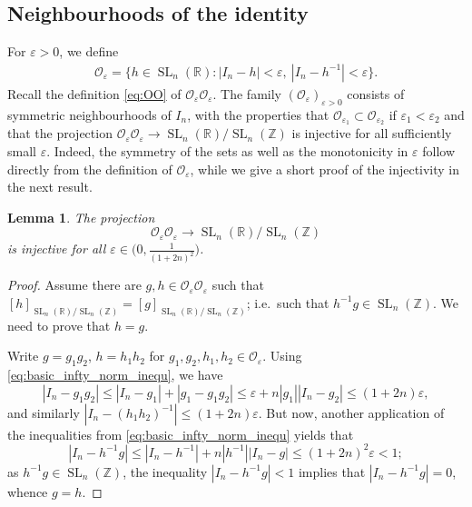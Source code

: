 \documentclass[11pt,reqno]{amsart}
\newtheorem{lem}[thm]{Lemma}
\theoremstyle{definition}
\theoremstyle{remark}
\newcommand{\SL}{\operatorname{SL}}
\numberwithin{equation}{section}
\numberwithin{thm}{section}
\numberwithin{table}{section}
\def \R {{\mathbb R}}
\def \Z {{\mathbb Z}}
\begin{document}
\subsection{Neighbourhoods of the identity}


 For $\varepsilon > 0$, we define 
\begin{align}\label{eq:nbh_id}
    \mathcal{O}_\varepsilon = 
    \{ 
    h \in \SL_n(\R):
    | 
    I_n - h
    | < \varepsilon, \ 
    | 
    I_n - h^{-1}
    | < \varepsilon
    \}.
\end{align}
Recall the definition \eqref{eq:OO} of 
$\mathcal{O}_{\varepsilon}\mathcal{O}_{\varepsilon}$.
The family $(\mathcal{O}_\varepsilon)_{\varepsilon>0}$ consists of symmetric neighbourhoods of $I_n$, with the properties that $\mathcal{O}_{\varepsilon_1} \subset \mathcal{O}_{\varepsilon_2}$ if $\varepsilon_1 < \varepsilon_2$ and that the projection $\mathcal{O}_{\varepsilon}\mathcal{O}_{\varepsilon} \to \SL_n(\R) / \SL_n(\Z)$ is injective for all sufficiently small $\varepsilon$. 
Indeed, the symmetry of the sets as well as the monotonicity in  $\varepsilon$ follow directly from the definition of $\mathcal{O}_\varepsilon$, while we give a short proof of the injectivity in the next result.

\begin{lem}
     The projection 
     $$
     \mathcal{O}_{\varepsilon}\mathcal{O}_{\varepsilon} \to \SL_n(\R) / \SL_n(\Z)
     $$ 
     is injective for all $\varepsilon \in \big(0,\frac{1}{(1+2n)^2}\big)$. 
\end{lem}
\begin{proof}
    Assume  there are $g,h \in \mathcal{O}_\varepsilon \mathcal{O}_{\varepsilon}$ such that $[h]_{\SL_n(\R) / \SL_n(\Z)} = [g]_{\SL_n(\R) / \SL_n(\Z)}$; i.e.\ such that $ h^{-1}g \in \SL_n(\Z)$. 
    We need to prove that $h =g$.
    
    Write $g = g_1 g_2$, $h = h_1 h_2$ for $g_1,g_2,h_1,h_2 \in \mathcal{O}_\varepsilon$. 
    Using \eqref{eq:basic_infty_norm_inequ}, we have  
\[
    | I_n - g_1 g_2 | \le | I_n - g_1| + | g_1 - g_1 g_2| \le \varepsilon + n | g_1 | | I_n - g_2| \le (1 + 2n) \varepsilon,
\]
and similarly $|
I_n - (h_1 h_2)^{-1}| \le (1+2n)\varepsilon$. But now, another application of the inequalities from \eqref{eq:basic_infty_norm_inequ} yields that 
\[
    | I_n - h^{-1}g | \le
    | I_n - h^{-1} | + n|h^{-1}| | I_n - g | \le 
    (1+2n)^2\varepsilon
    < 1;
\]
as  $h^{-1}g \in \SL_n(\Z)$, the inequality $ | I_n - h^{-1}g | < 1 $ implies that $| I_n - h^{-1}g | =0$, whence $g =h$.
\end{proof} 
\end{document}
